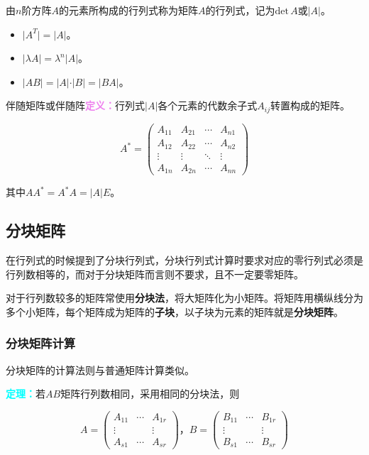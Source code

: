 \documentclass[UTF8, 12pt]{ctexart}
\begin{document}
由$n$阶方阵$A$的元素所构成的行列式称为矩阵$A$的行列式，记为$\textrm{det}\,A$或$\vert A\vert$。

\begin{itemize}
    \item $\vert A^T\vert=\vert A\vert$。
    \item $\vert\lambda A\vert=\lambda^n\vert A\vert$。
    \item $\vert AB\vert=\vert A\vert\cdot\vert B\vert=\vert BA\vert$。
\end{itemize}

伴随矩阵或伴随阵\textcolor{violet}{\textbf{定义：}}行列式$\vert A\vert$各个元素的代数余子式$A_{ij}$转置构成的矩阵。

$$A^*=\left(
    \begin{array}{cccc}
        A_{11} & A_{21} & \cdots & A_{n1} \\
        A_{12} & A_{22} & \cdots & A_{n2} \\
        \vdots & \vdots & \ddots & \vdots \\
        A_{1n} & A_{2n} & \cdots & A_{nn}
    \end{array}
\right)$$

其中$AA^*=A^*A=\vert A\vert E$。

\subsection{分块矩阵}

在行列式的时候提到了分块行列式，分块行列式计算时要求对应的零行列式必须是行列数相等的，而对于分块矩阵而言则不要求，且不一定要零矩阵。

对于行列数较多的矩阵常使用\textbf{分块法}，将大矩阵化为小矩阵。将矩阵用横纵线分为多个小矩阵，每个矩阵成为矩阵的\textbf{子块}，以子块为元素的矩阵就是\textbf{分块矩阵}。

\subsubsection{分块矩阵计算}

分块矩阵的计算法则与普通矩阵计算类似。

\textcolor{aqua}{\textbf{定理：}}若$AB$矩阵行列数相同，采用相同的分块法，则

$$A=\left(
    \begin{array}{ccc}
        A_{11} & \cdots & A_{1r} \\
        \vdots & & \vdots \\
        A_{s1} & \cdots & A_{sr}
    \end{array}
\right)\text{，}B=\left(
    \begin{array}{ccc}
        B_{11} & \cdots & B_{1r} \\
        \vdots & & \vdots \\
        B_{s1} & \cdots & B_{sr}
    \end{array}
\right)$$
\end{document}

